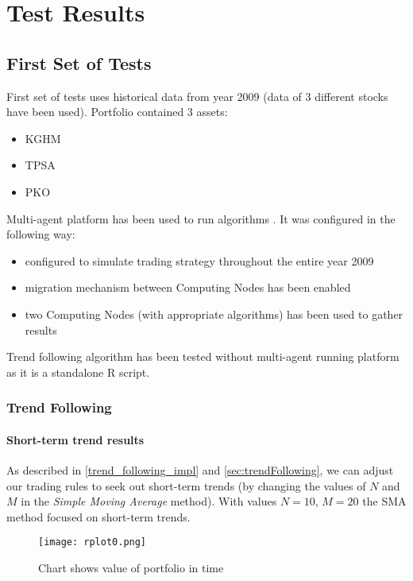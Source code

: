 \chapter{Test Results}
\label{cha:pierwszyDokument}

\section{First Set of Tests}

First set of tests uses historical data from year 2009 (data of 3 different stocks have been used). 
Portfolio contained 3 assets:

\begin{itemize} 
  \item KGHM
  \item TPSA
  \item PKO
\end{itemize}

Multi-agent platform has been used to run algorithms .
It was configured in the following way: 

\begin{itemize}
  \item configured to simulate trading strategy throughout the entire year 2009
  \item migration mechanism between Computing Nodes has been enabled
  \item two Computing Nodes (with appropriate algorithms) has been used to gather results
\end{itemize}

Trend following algorithm has been tested without multi-agent running platform as it is a standalone R script.

\subsection{Trend Following}

\subsubsection{Short-term trend results}

As described in \ref{trend_following_impl} and \ref{sec:trendFollowing}, we can adjust our trading rules to seek out short-term trends
 (by changing the values of $N$ and $M$ in the \emph{Simple Moving Average} method).
With values $N = 10$, $M = 20$ the SMA method focused on short-term trends.
 

\begin{figure}[H]
  
  \begin{center}
    \texttt{[image: rplot0.png]}
  \end{center}
  \caption{Chart shows value of portfolio in time}
  \label{fig:trend-short}
\end{figure}


